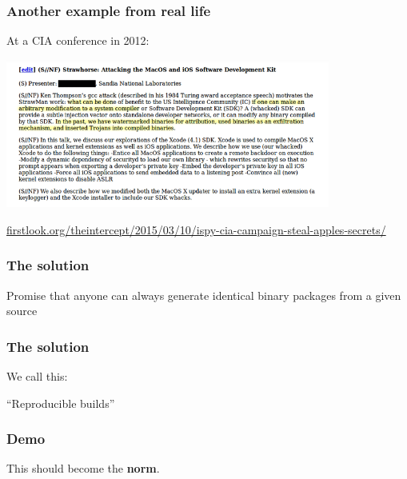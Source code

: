 \documentclass[14pt,aspectratio=169]{beamer}
\begin{document}
\begin{frame}[fragile]
 \frametitle{Another example from real life}

 At a CIA conference in 2012:
 \begin{center}
  \includegraphics[width=0.8\textwidth]{images/strawhorse.png}

  {\footnotesize
  \url{firstlook.org/theintercept/2015/03/10/ispy-cia-campaign-steal-apples-secrets/}
  }
 \end{center}
\end{frame}


\begin{frame}
 \frametitle{The solution}

 \begin{center}
 \Large{
 Promise that anyone can always generate
 identical binary packages
 from a given source}
\end{center}
\end{frame}


\begin{frame}
 \frametitle{The solution}

 \begin{center}
 We call this:

 \Huge{ “Reproducible builds” }
 \end{center}
\end{frame}

\begin{frame}
 \frametitle{Demo}
%
%
\end{frame}

\begin{frame}[plain]
\begin{center}
 \Huge{This should become the \textbf{norm}.}

\end{center}
\end{frame}
\end{document}
